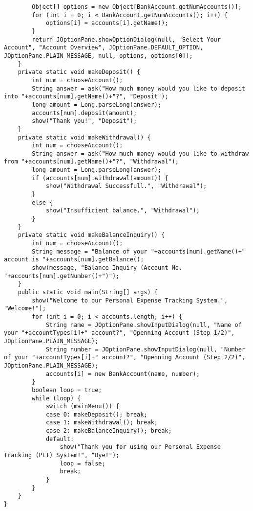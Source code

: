 \documentclass[12pt,letterpaper,twoside]{article}
\begin{document}
\begin{enumerate}
\begin{lstlisting}
		Object[] options = new Object[BankAccount.getNumAccounts()];
		for (int i = 0; i < BankAccount.getNumAccounts(); i++) {
			options[i] = accounts[i].getName();
		}
		return JOptionPane.showOptionDialog(null, "Select Your Account", "Account Overview", JOptionPane.DEFAULT_OPTION, JOptionPane.PLAIN_MESSAGE, null, options, options[0]);
	}
	private static void makeDeposit() {
		int num = chooseAccount();
		String answer = ask("How much money would you like to deposit into "+accounts[num].getName()+"?", "Deposit");
		long amount = Long.parseLong(answer);
		accounts[num].deposit(amount);
		show("Thank you!", "Deposit");
	}
	private static void makeWithdrawal() {
		int num = chooseAccount();
		String answer = ask("How much money would you like to withdraw from "+accounts[num].getName()+"?", "Withdrawal");
		long amount = Long.parseLong(answer);
		if (accounts[num].withdrawal(amount)) {
			show("Withdrawal Successfull.", "Withdrawal");
		}
		else {
			show("Insufficient balance.", "Withdrawal");
		}
	}
	private static void makeBalanceInquiry() {
		int num = chooseAccount();
		String message = "Balance of your "+accounts[num].getName()+" account is "+accounts[num].getBalance();
		show(message, "Balance Inquiry (Account No. "+accounts[num].getNumber()+")");
	}
	public static void main(String[] args) {
		show("Welcome to our Personal Expense Tracking System.", "Welcome!");
		for (int i = 0; i < accounts.length; i++) {
			String name = JOptionPane.showInputDialog(null, "Name of your "+accountTypes[i]+" account?", "Openning Account (Step 1/2)", JOptionPane.PLAIN_MESSAGE);
			String number = JOptionPane.showInputDialog(null, "Number of your "+accountTypes[i]+" account?", "Openning Account (Step 2/2)", JOptionPane.PLAIN_MESSAGE);
			accounts[i] = new BankAccount(name, number);
		}
		boolean loop = true;
		while (loop) {
			switch (mainMenu()) {
			case 0: makeDeposit(); break;
			case 1:	makeWithdrawal(); break;
			case 2:	makeBalanceInquiry(); break;
			default:
				show("Thank you for using our Personal Expense Tracking (PET) System!", "Bye!");
				loop = false;
				break;
			}
		}
	}
}
\end{lstlisting}
\end{enumerate}
\end{document}

